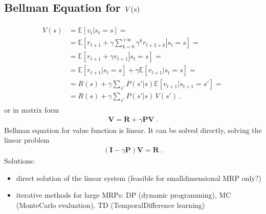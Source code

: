 \documentclass[letterpaper,10pt,english]{jupyterBook}
\begin{document}
\subsection{Bellman Equation for \protect\(V(s)\protect\)}
\label{\detokenize{ch/rl/mdp:bellman-equation-for-v-s}}\begin{equation*}
\begin{split}\begin{aligned}
  V(s) 
  & = \mathbb{E} \left[ v_t | s_t = s \right] = \\
  & = \mathbb{E} \left[ \left. r_{t+1} + \gamma \sum_{k=0}^{+\infty} \gamma^{k} r_{t+2+k} \right| s_t = s \right] = \\
  & = \mathbb{E} \left[ \left. r_{t+1} + \gamma v_{t+1} \right| s_t = s \right] = \\
  & = \mathbb{E} \left[  r_{t+1} | s_t = s \right] + \gamma \mathbb{E} \left[ v_{t+1} | s_t = s \right] = \\
  & = R(s) + \gamma \sum_{s'} P(s'|s) \mathbb{E} \left[ v_{t+1} | s_{t+1} = s' \right] = \\
  & = R(s) + \gamma \sum_{s'} P(s'|s) \, V(s') \ .
\end{aligned}\end{split}
\end{equation*}
\sphinxAtStartPar
or in matrix form
\begin{equation*}
\begin{split}\mathbf{V} = \mathbf{R} + \gamma \mathbf{P} \mathbf{V} \ .\end{split}
\end{equation*}
\sphinxAtStartPar
{} Bellman equation for value function is linear. It can be solved directly, solving the linear problem
\begin{equation*}
\begin{split}\left( \mathbf{I} - \gamma \mathbf{P} \right) \mathbf{V} = \mathbf{R} \ .\end{split}
\end{equation*}
\sphinxAtStartPar
Solutions:
\begin{itemize}
\item {} 
\sphinxAtStartPar
direct solution of the linear system (feasible for small\sphinxhyphen{}dimensional MRP only?)

\item {} 
\sphinxAtStartPar
iterative methods for large MRPs: DP (dynamic programming), MC (Monte\sphinxhyphen{}Carlo evaluation), TD (Temporal\sphinxhyphen{}Difference learning)

\end{itemize}
\end{document}
